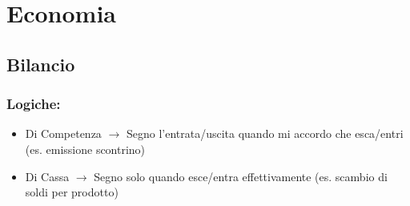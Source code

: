 \documentclass[a4paper]{report}
\begin{document}
\chapter*{Economia}
\section*{Bilancio}

\subsection*{Logiche:}

\begin{itemize}
    \item Di Competenza $\longrightarrow$ Segno l'entrata/uscita quando mi accordo che esca/entri (es. emissione scontrino)
    \item Di Cassa $\longrightarrow$ Segno solo quando esce/entra effettivamente (es. scambio di soldi per prodotto)
\end{itemize}
\end{document}
